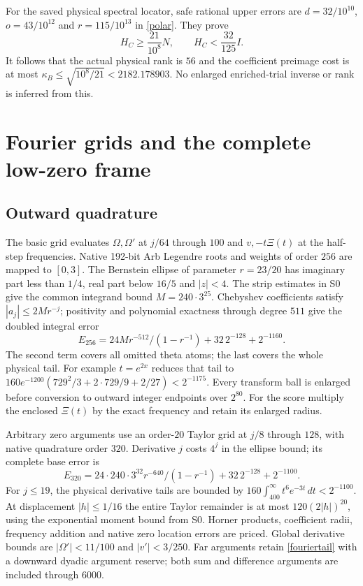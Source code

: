 \documentclass[11pt]{article}
\newcommand{\dd}{\,d}
\numberwithin{equation}{section}
\begin{document}
For the saved physical spectral locator, safe rational upper errors
are $d=32/10^{10}$, $o=43/10^{12}$ and $r=115/10^{13}$ in
\eqref{polar}. They prove
\begin{equation}\label{physicalbounds}
 H_C\ge\frac{21}{10^8}N,
 \qquad H_C<\frac{32}{125}I.
\end{equation}
It follows that the actual physical rank is $56$ and the coefficient
preimage cost is at most $\kappa_B\le\sqrt{10^8/21}<2182.178903$.
No enlarged enriched-trial inverse or rank is inferred from this.

\section{Fourier grids and the complete low-zero frame}\label{zeros}
\subsection{Outward quadrature}
The basic grid evaluates $\Omega,\Omega'$ at $j/64$ through $100$
and $v,-t\Xi(t)$ at the half-step frequencies. Native 192-bit Arb
Legendre roots and weights of order $256$ are mapped to $[0,3]$.
The Bernstein ellipse of parameter $r=23/20$ has imaginary part less
than $1/4$, real part below $16/5$ and $|z|<4$. The strip estimates
in S0 give the common integrand bound $M=240\cdot3^{25}$.
Chebyshev coefficients satisfy $|a_j|\le2Mr^{-j}$; positivity and
polynomial exactness through degree $511$ give the doubled integral
error
\[
 E_{256}=24M r^{-512}/(1-r^{-1})+32\,2^{-128}+2^{-1160}.
\]
The second term covers all omitted theta atoms; the last covers the
whole physical tail. For example $t=e^{2x}$ reduces that tail to
$160e^{-1200}(729^2/3+2\cdot729/9+2/27)<2^{-1175}$.
Every transform ball is enlarged before conversion to outward
integer endpoints over $2^{80}$. For the score multiply the enclosed
$\Xi(t)$ by the exact frequency and retain its enlarged radius.

Arbitrary zero arguments use an order-$20$ Taylor grid at $j/8$
through $128$, with native quadrature order $320$. Derivative $j$
costs $4^j$ in the ellipse bound; its complete base error is
\[
 E_{320}=24\cdot240\cdot3^{32}r^{-640}/(1-r^{-1})
                     +32\,2^{-128}+2^{-1100}.
\]
For $j\le19$, the physical derivative tails are bounded by
$160\int_{400}^\infty t^6e^{-3t}\dd t<2^{-1100}$. At displacement
$|h|\le1/16$ the entire Taylor remainder is at most
$120(2|h|)^{20}$, using the exponential moment bound from S0.
Horner products, coefficient radii, frequency addition and native zero
location errors are priced. Global derivative bounds are
$|\Omega'|<11/100$ and $|v'|<3/250$. Far arguments retain
\eqref{fouriertail} with a downward dyadic argument reserve; both
sum and difference arguments are included through $6000$.
\end{document}
